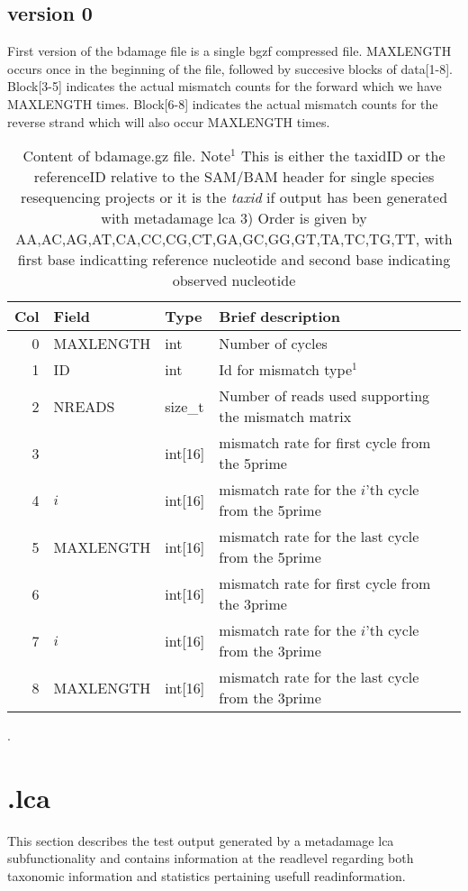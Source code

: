 \documentclass[10pt]{article}
\begin{document}
\subsection{version 0}
First version of the bdamage file is a single bgzf compressed file. MAXLENGTH occurs once in the beginning of the file, followed by succesive blocks of data[1-8]. Block[3-5] indicates the actual mismatch counts for the forward which we have MAXLENGTH times. Block[6-8] indicates the actual mismatch counts for the reverse strand which will also occur MAXLENGTH times. 
\begin{table}[h!]
\begin{tabular}{rllll}
  \hline
  {\bf Col} & {\bf Field} & {\bf Type} & {\bf Brief description} \\
  \hline
  0 & {\sf MAXLENGTH} & int &  Number of cycles\\\hline
  1 & {\sf ID} & int &  Id for mismatch type$^1$\\
  2 & {\sf NREADS} & size\_t & Number of reads used supporting the mismatch matrix\\\hline\hline
  3 & {\sf 1} & int[16] & mismatch rate for first cycle from the 5prime\\
  4 & {\sf $i$} & int[16] & mismatch rate for the $i$'th cycle from the 5prime\\
  5 & {\sf MAXLENGTH} & int[16] & mismatch rate for the last cycle from the 5prime\\\hline
  6 & {\sf 1} & int[16] & mismatch rate for first cycle from the 3prime\\
  7 & {\sf $i$} & int[16] & mismatch rate for the $i$'th cycle from the 3prime\\
  8 & {\sf MAXLENGTH} & int[16] & mismatch rate for the last cycle from the 3prime\\\hline
  \hline
\end{tabular}\label{tab1}
\caption{Content of bdamage.gz file. Note$^1$ This is either the taxidID or the referenceID relative to the SAM/BAM header for single species resequencing projects or it is the \textit{taxid} if output has been generated with metadamage lca 3) Order is given by AA,AC,AG,AT,CA,CC,CG,CT,GA,GC,GG,GT,TA,TC,TG,TT, with first base indicatting reference nucleotide and second base indicating observed nucleotide}.
\end{table}
 
\clearpage
\section{.lca}
This section describes the test output generated by a metadamage lca subfunctionality and contains information at the readlevel regarding both taxonomic information and statistics pertaining usefull readinformation.\\
\end{document}
